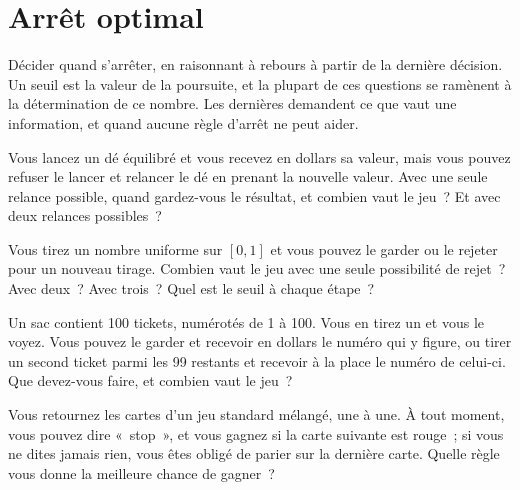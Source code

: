 \chapter{Arrêt optimal}\label{ch:iv1:optimal-stopping}

\begin{ivtrains}
Décider quand s'arrêter, en raisonnant à rebours à partir de la dernière décision. Un seuil est la valeur de la poursuite, et la plupart de ces questions se ramènent à la détermination de ce nombre. Les dernières demandent ce que vaut une information, et quand aucune règle d'arrêt ne peut aider.
\end{ivtrains}

\begin{question}\label{iq:iv1:optimal-stopping:1}
Vous lancez un dé équilibré et vous recevez en dollars sa valeur, mais vous pouvez refuser le lancer et relancer le dé en prenant la nouvelle valeur. Avec une seule relance possible, quand gardez-vous le résultat, et combien vaut le jeu~? Et avec deux relances possibles~?
\end{question}

\begin{question}\label{iq:iv1:optimal-stopping:2}
Vous tirez un nombre uniforme sur $[0, 1]$ et vous pouvez le garder ou le rejeter pour un nouveau tirage. Combien vaut le jeu avec une seule possibilité de rejet~? Avec deux~? Avec trois~? Quel est le seuil à chaque étape~?
\end{question}

\begin{question}\label{iq:iv1:optimal-stopping:3}
Un sac contient 100 tickets, numérotés de 1 à 100. Vous en tirez un et vous le voyez. Vous pouvez le garder et recevoir en dollars le numéro qui y figure, ou tirer un second ticket parmi les 99 restants et recevoir à la place le numéro de celui-ci. Que devez-vous faire, et combien vaut le jeu~?
\end{question}

\begin{question}\label{iq:iv1:optimal-stopping:4}
Vous retournez les cartes d'un jeu standard mélangé, une à une. À tout moment, vous pouvez dire «~stop~», et vous gagnez si la carte suivante est rouge~; si vous ne dites jamais rien, vous êtes obligé de parier sur la dernière carte. Quelle règle vous donne la meilleure chance de gagner~?
\end{question}

